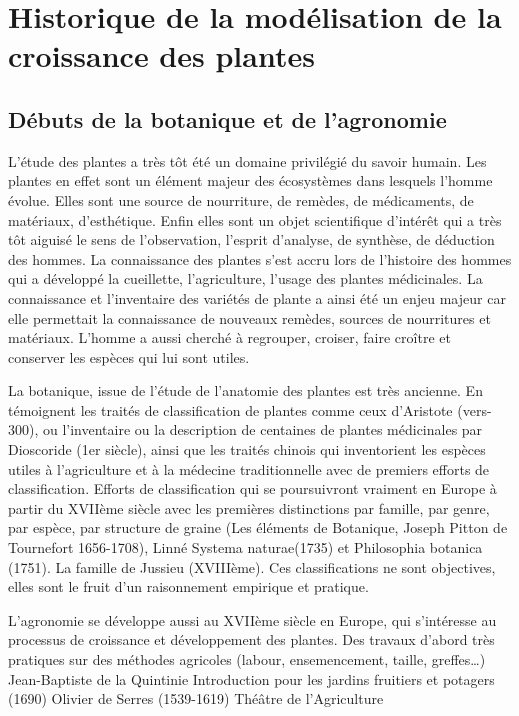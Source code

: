 \section{Historique de la modélisation de la croissance des plantes}

\subsection{Débuts de la botanique et de l'agronomie}

L’étude des plantes a très tôt été un domaine privilégié du savoir humain. Les plantes en effet sont un élément majeur des écosystèmes dans lesquels l’homme évolue. Elles sont une source de nourriture, de remèdes, de médicaments, de matériaux, d’esthétique. Enfin elles sont un objet scientifique d’intérêt qui a très tôt aiguisé le sens de l’observation, l’esprit d’analyse, de synthèse, de déduction des hommes. La connaissance des plantes s’est accru lors de l’histoire des hommes qui a développé la cueillette, l’agriculture, l’usage des plantes médicinales. La connaissance et l’inventaire des variétés de plante a ainsi été un enjeu majeur car elle permettait la connaissance de nouveaux remèdes, sources de nourritures et matériaux. L’homme a aussi cherché à regrouper, croiser, faire croître et conserver les espèces qui lui sont utiles.

La botanique, issue de l’étude de l’anatomie des plantes est très ancienne. En témoignent les traités de classification de plantes comme ceux d’Aristote (vers-300), ou l’inventaire ou la description de centaines de plantes médicinales par Dioscoride (1er siècle), ainsi que les traités chinois qui inventorient les espèces utiles à l’agriculture et à la médecine traditionnelle avec de premiers efforts de classification. Efforts de classification qui se poursuivront vraiment en Europe à partir du XVIIème siècle avec les premières distinctions par famille, par genre, par espèce, par structure de graine (Les éléments de Botanique,  Joseph Pitton de Tournefort 1656-1708),   Linné Systema naturae(1735) et Philosophia botanica (1751). La famille de Jussieu (XVIIIème). Ces classifications ne sont objectives, elles sont le fruit d’un raisonnement empirique et pratique.

L’agronomie se développe aussi au XVIIème siècle en Europe, qui s’intéresse au processus de croissance et développement des plantes. Des travaux d’abord très pratiques sur des méthodes agricoles (labour, ensemencement, taille, greffes…) Jean-Baptiste de la Quintinie Introduction pour les jardins fruitiers et potagers (1690)  Olivier de Serres (1539-1619) Théâtre de l'Agriculture


